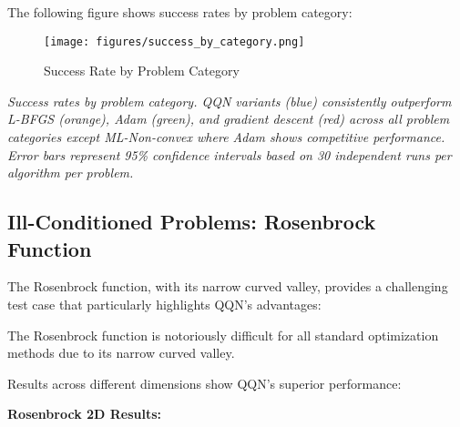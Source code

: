 The following figure shows success rates by problem category:

\begin{figure}
\centering
\texttt{[image: figures/success\_by\_category.png]}
\caption{Success Rate by Problem Category}
\end{figure}

\emph{Success rates by problem category. QQN variants (blue) consistently outperform L-BFGS (orange), Adam (green), and gradient descent (red) across all problem categories except ML-Non-convex where Adam shows competitive performance. Error bars represent 95\% confidence intervals based on 30 independent runs per algorithm per problem.}

\hypertarget{ill-conditioned-problems-rosenbrock-function}{%
\subsection{Ill-Conditioned Problems: Rosenbrock Function}\label{ill-conditioned-problems-rosenbrock-function}}

The Rosenbrock function, with its narrow curved valley, provides a challenging test case that particularly highlights QQN's advantages:

The Rosenbrock function is notoriously difficult for all standard optimization methods due to its narrow curved valley.

Results across different dimensions show QQN's superior performance:

\textbf{Rosenbrock 2D Results:}

